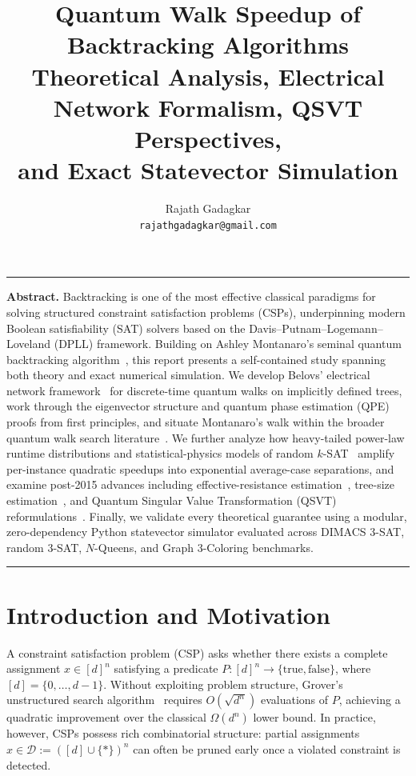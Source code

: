 \documentclass[11pt,a4paper]{article}
\title{\textbf{Quantum Walk Speedup of Backtracking Algorithms}\\[0.35em]
\large Theoretical Analysis, Electrical Network Formalism, QSVT Perspectives,\\
and Exact Statevector Simulation}
\author{Rajath Gadagkar\\\texttt{rajathgadagkar@gmail.com}}
\date{}
\begin{document}
\maketitle
\vspace{-0.8em}
\hrule
\vspace{0.8em}

\noindent\textbf{Abstract.}
Backtracking is one of the most effective classical paradigms for solving structured constraint satisfaction problems (CSPs), underpinning modern Boolean satisfiability (SAT) solvers based on the Davis--Putnam--Logemann--Loveland (DPLL) framework. Building on Ashley Montanaro's seminal quantum backtracking algorithm~\cite{montanaro2015,montanaro2018}, this report presents a self-contained study spanning both theory and exact numerical simulation. We develop Belovs' electrical network framework~\cite{belovs2013} for discrete-time quantum walks on implicitly defined trees, work through the eigenvector structure and quantum phase estimation (QPE) proofs from first principles, and situate Montanaro's walk within the broader quantum walk search literature~\cite{ambainis2004,szegedy2004,magniez2011,childs2003}. We further analyze how heavy-tailed power-law runtime distributions and statistical-physics models of random $k$-SAT~\cite{cocco2001} amplify per-instance quadratic speedups into exponential average-case separations, and examine post-2015 advances including effective-resistance estimation~\cite{jarret2018}, tree-size estimation~\cite{ambainis2017}, and Quantum Singular Value Transformation (QSVT) reformulations~\cite{gilyen2019,aoki2026}. Finally, we validate every theoretical guarantee using a modular, zero-dependency Python statevector simulator evaluated across DIMACS 3-SAT, random 3-SAT, $N$-Queens, and Graph 3-Coloring benchmarks.

\vspace{0.5em}
\hrule
\tableofcontents
\vspace{0.8em}

\section{Introduction and Motivation}

A constraint satisfaction problem (CSP) asks whether there exists a complete assignment $x \in [d]^n$ satisfying a predicate $P : [d]^n \to \{\text{true}, \text{false}\}$, where $[d] = \{0, \dots, d-1\}$. Without exploiting problem structure, Grover's unstructured search algorithm~\cite{grover1997} requires $O(\sqrt{d^n})$ evaluations of $P$, achieving a quadratic improvement over the classical $\Omega(d^n)$ lower bound. In practice, however, CSPs possess rich combinatorial structure: partial assignments $x \in \mathcal{D} := ([d] \cup \{*\})^n$ can often be pruned early once a violated constraint is detected.
\end{document}
